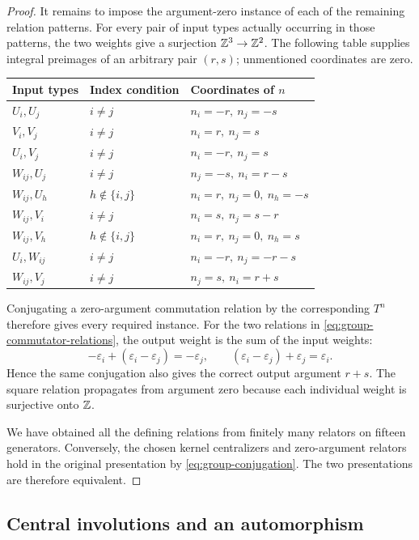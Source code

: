 \begin{proof}
It remains to impose the argument-zero instance of each of the
remaining relation patterns.  For every pair of input types actually
occurring in those patterns, the two weights give a surjection
$\mathbb Z^3\to\mathbb Z^2$.  The following table supplies integral preimages of
an arbitrary pair $(r,s)$; unmentioned coordinates are zero.
\begin{center}
\small
\begin{tabular}{@{}lll@{}}
\toprule
Input types & Index condition & Coordinates of $n$ \\
\midrule
$U_i,U_j$ & $i\neq j$ & $n_i=-r,\ n_j=-s$ \\
$V_i,V_j$ & $i\neq j$ & $n_i=r,\ n_j=s$ \\
$U_i,V_j$ & $i\neq j$ & $n_i=-r,\ n_j=s$ \\
$W_{ij},U_j$ & $i\neq j$ & $n_j=-s,\ n_i=r-s$ \\
$W_{ij},U_h$ & $h\notin\{i,j\}$ &
  $n_i=r,\ n_j=0,\ n_h=-s$ \\
$W_{ij},V_i$ & $i\neq j$ & $n_i=s,\ n_j=s-r$ \\
$W_{ij},V_h$ & $h\notin\{i,j\}$ &
  $n_i=r,\ n_j=0,\ n_h=s$ \\
$U_i,W_{ij}$ & $i\neq j$ & $n_i=-r,\ n_j=-r-s$ \\
$W_{ij},V_j$ & $i\neq j$ & $n_j=s,\ n_i=r+s$ \\
\bottomrule
\end{tabular}
\end{center}
Conjugating a zero-argument commutation relation by the corresponding
$T^n$ therefore gives every required instance.  For the two relations
in \eqref{eq:group-commutator-relations}, the output weight is the sum
of the input weights:
\[
  -\varepsilon_i+(\varepsilon_i-\varepsilon_j)=-\varepsilon_j,
  \qquad
  (\varepsilon_i-\varepsilon_j)+\varepsilon_j=\varepsilon_i.
\]
Hence the same conjugation also gives the correct output argument
$r+s$.  The square relation propagates from argument zero because
each individual weight is surjective onto $\mathbb Z$.

We have obtained all the defining relations from finitely many
relators on fifteen generators.  Conversely, the chosen kernel
centralizers and zero-argument relators hold in the original
presentation by \eqref{eq:group-conjugation}.  The two presentations
are therefore equivalent.
\end{proof}

\subsection{Central involutions and an automorphism}

